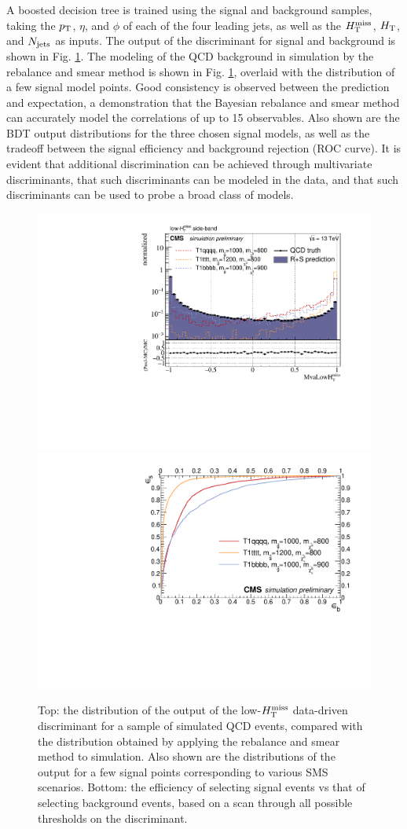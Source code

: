 A boosted decision tree is trained using the signal and background samples, taking the $p_{\text{T}}$, $\eta$, and $\phi$ of each of the four leading jets, as well as the $H_{\text{T}}^{\rm miss}$, $H_{\rm T}$, and $N_{\rm jets}$ as inputs. The output of the discriminant for signal and background is shown in Fig. \ref{fig:SusyBdt}. The modeling of the QCD background in simulation by the rebalance and smear method is shown in Fig. \ref{fig:SusyBdt}, overlaid with the distribution of a few signal model points. Good consistency is observed between the prediction and expectation, a demonstration that the Bayesian rebalance and smear method can accurately model the correlations of up to 15 observables. Also shown are the BDT output distributions for the three chosen signal models, as well as the tradeoff between the signal efficiency and background rejection (ROC curve). It is evident that additional discrimination can be achieved through multivariate discriminants, that such discriminants can be modeled in the data, and that such discriminants can be used to probe a broad class of models.
\begin{figure}[h]
\centering
\includegraphics[width=0.7\linewidth]{figures/SusySearches/MvaLowMht.pdf}
\includegraphics[width=0.7\linewidth]{figures/SusySearches/RocCurvesLowMht_QCDVsSUSY.pdf}
\caption{Top: the distribution of the output of the low-$H_{\text{T}}^{\rm miss}$ data-driven discriminant for a sample of simulated QCD events, compared with the distribution obtained by applying the rebalance and smear method to simulation. Also shown are the distributions of the output for a few signal points corresponding to various SMS scenarios. Bottom: the efficiency of selecting signal events vs that of selecting background events, based on a scan through all possible thresholds on the discriminant.}
\label{fig:SusyBdt}
\end{figure}

